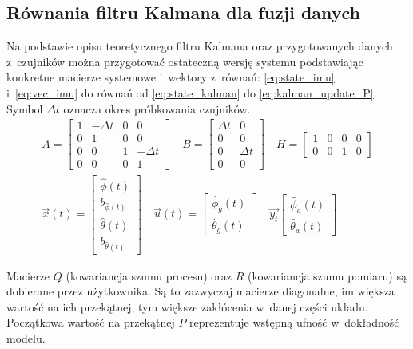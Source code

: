 \subsection{Równania filtru Kalmana dla fuzji danych}
Na podstawie opisu teoretycznego filtru Kalmana oraz przygotowanych danych
z~czujników można przygotować ostateczną wersję systemu podstawiając konkretne
macierze systemowe i~wektory z~równań: \ref{eq:state_imu} i~\ref{eq:vec_imu} do
równań od \ref{eq:state_kalman} do \ref{eq:kalman_update_P}.
Symbol $ \Delta t $ oznacza okres próbkowania czujników.
\begin{gather}
	A = 
	\begin{bmatrix}
		1 & -\Delta t & 0 & 0 \\
		0 & 1         & 0 & 0 \\
		0 & 0          & 1 & -\Delta t \\
		0 & 0         & 0 & 1 
	\end{bmatrix}
	\quad
	B = 
	\begin{bmatrix}
		\Delta t & 0 \\
		0        & 0 \\
		0        & \Delta t \\
		0        & 0
	\end{bmatrix}
	\quad
	H =
	\begin{bmatrix}
		1 & 0 & 0 & 0 \\
		0 & 0 & 1 & 0
	\end{bmatrix}
\label{eq:state_imu} \\
	\vec{x}\left(t\right) = 
	\begin{bmatrix}
		\hat{\phi}\left(t\right) \\
		b_{\hat{\phi}\left(t\right)} \\
		\hat{\theta}\left(t\right) \\
		b_{\hat{\theta}\left(t\right)}
	\end{bmatrix}
	\quad
	\vec{u}\left(t\right) = 
	\begin{bmatrix}
		\dot{\phi_{g}}\left(t\right) \\
		\dot{\theta_{g}}\left(t\right)
	\end{bmatrix}
	\quad
	\vec{y_t}
	\begin{bmatrix}
		\tilde{\phi_{a}}\left(t\right) \\
		\tilde{\theta_{a}}\left(t\right)
	\end{bmatrix}
\label{eq:vec_imu}
\end{gather}

Macierze $ Q $ (kowariancja szumu procesu) oraz $ R $ (kowariancja szumu
pomiaru) są dobierane przez użytkownika.
Są to zazwyczaj macierze diagonalne, im większa wartość na ich przekątnej, tym
większe zakłócenia w~danej części układu.
Początkowa wartość na przekątnej $ P $ reprezentuje wstępną ufność
w~dokładność modelu.

